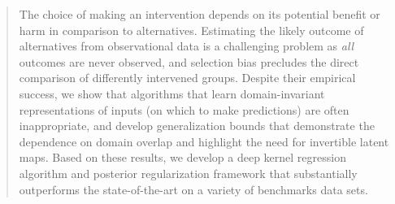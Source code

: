 \documentclass[twoside]{article}
\begin{document}
%

%


\begin{abstract}
The choice of making an intervention depends on its potential benefit or harm in comparison to alternatives. Estimating the likely outcome of alternatives from observational data is a challenging problem as \textit{all} outcomes are never observed, and selection bias precludes the direct comparison of differently intervened groups. Despite their empirical success, we show that algorithms that learn domain-invariant representations of inputs (on which to make predictions) are often inappropriate, and develop generalization bounds that demonstrate the dependence on domain overlap and highlight the need for invertible latent maps. Based on these results, we develop a deep kernel regression algorithm and posterior regularization framework that substantially outperforms the state-of-the-art on a variety of benchmarks data sets.
\end{abstract}
\end{document}
